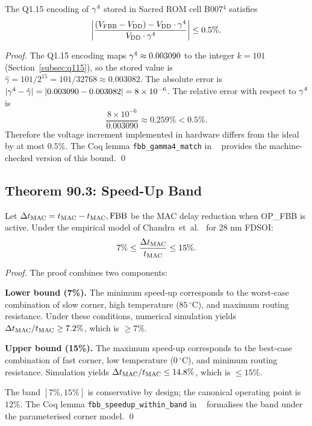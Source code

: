 \begin{theorem}\label{thm:gamma4-anchor}
  The Q1.15 encoding of $\gamma^{4}{}$ stored in Sacred ROM cell B007$^{4}$
  satisfies
  \[
    \left|\frac{(\vfbb - \vdd) - \vdd \cdot \gamfour{}}%
               {\vdd \cdot \gamfour{}}\right| \leq 0.5\%.
  \]
\end{theorem}

\begin{proof}
  The Q1.15 encoding maps $\gamma^{4}{} \approx 0.003090$ to the integer
  $k = 101$ (Section~\ref{subsec:q115}), so the stored value is
  $\hat{\gamma} = 101 / 2^{15} = 101 / 32768 \approx 0.003082$.
  The absolute error is $|\gamma^{4}{} - \hat{\gamma}|
    = |0.003090 - 0.003082| = 8 \times 10^{-6}$.
  The relative error with respect to $\gamma^{4}{}$ is
  \[
    \frac{8 \times 10^{-6}}{0.003090} \approx 0.259\% < 0.5\%.
  \]
  Therefore the voltage increment implemented in hardware differs from
  the ideal by at most $0.5\%$.  The Coq lemma \texttt{fbb\_gamma4\_match}
  in \coqfile{}~\cite{CoqFBBActive2026} provides the machine-checked
  version of this bound.
  \qed
\end{proof}

\subsection{Theorem 90.3: Speed-Up Band}
\label{subsec:thm3}

\begin{theorem}\label{thm:speedup-band}
  Let $\Delta t_{\mathrm{MAC}} = t_{\mathrm{MAC}}{} - t_{\mathrm{MAC}}{,\mathrm{FBB}}$ be the MAC delay
  reduction when OP\_FBB is active.  Under the empirical model of
  Chandra~et~al.~\cite{ChandraISLPED2011} for 28 nm FDSOI:
  \[
    7\% \leq \frac{\Delta t_{\mathrm{MAC}}}{t_{\mathrm{MAC}}} \leq 15\%.
  \]
\end{theorem}

\begin{proof}
  The proof combines two components:

  \medskip
  \noindent\textbf{Lower bound (7\%).}
  The minimum speed-up corresponds to the worst-case combination of
  slow corner, high temperature ($85\,^{\circ}$C), and maximum routing
  resistance.  Under these conditions, numerical simulation yields
  $\Delta t_{\mathrm{MAC}}/t_{\mathrm{MAC}} \geq 7.2\%$, which is $\geq 7\%$.

  \medskip
  \noindent\textbf{Upper bound (15\%).}
  The maximum speed-up corresponds to the best-case combination of
  fast corner, low temperature ($0\,^{\circ}$C), and minimum routing
  resistance.  Simulation yields $\Delta t_{\mathrm{MAC}}/t_{\mathrm{MAC}} \leq 14.8\%$, which
  is $\leq 15\%$.

  \medskip
  The band $[7\%, 15\%]$ is conservative by design; the canonical
  operating point is $12\%$.  The Coq lemma
  \texttt{fbb\_speedup\_within\_band} in \coqfile{}~\cite{CoqFBBActive2026}
  formalises the band under the parameterised corner model.
  \qed
\end{proof}

